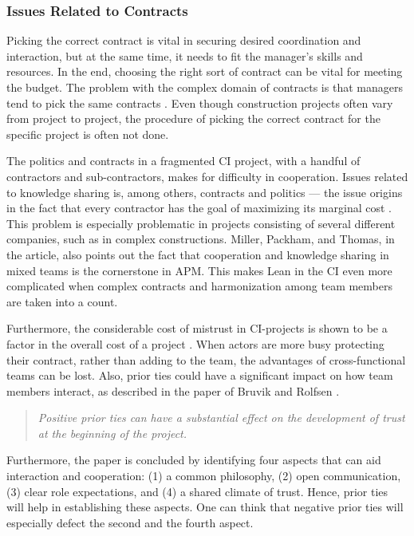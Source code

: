 \subsubsection*{Issues Related to Contracts}
Picking the correct contract is vital in securing desired coordination and interaction, but at the same time, it needs to fit the manager's skills and resources. In the end, choosing the right sort of contract can be vital for meeting the budget. The problem with the complex domain of contracts is that managers tend to pick the same contracts \cite{laedre2006procurement}. Even though construction projects often vary from project to project, the procedure of picking the correct contract for the specific project is often not done.

The politics and contracts in a fragmented CI project, with a handful of contractors and sub-contractors, makes for difficulty in cooperation. Issues related to knowledge sharing is, among others, contracts and politics \cite{alashwal2011knowledge} — the issue origins in the fact that every contractor has the goal of maximizing its marginal cost \cite{miller2002harmonization}. This problem is especially problematic in projects consisting of several different companies, such as in complex constructions. Miller, Packham, and Thomas, in the article, also points out the fact that cooperation and knowledge sharing in mixed teams is the cornerstone in APM. This makes Lean in the CI even more complicated when complex contracts and harmonization among team members are taken into a count. 

Furthermore, the considerable cost of mistrust in CI-projects is shown to be a factor in the overall cost of a project \cite{zaghloul2003construction}. When actors are more busy protecting their contract, rather than adding to the team, the advantages of cross-functional teams can be lost.  Also, prior ties could have a significant impact on how team members interact, as described in the paper of Bruvik and Rolfsen \cite{rolfsen}. 
\begin{quote}
    \textit{Positive prior ties can have a substantial effect on the development of trust at the beginning of the project.}
\end{quote}
Furthermore, the paper is concluded by identifying four aspects that can aid interaction and cooperation: (1) a common philosophy, (2) open communication, (3) clear role expectations, and (4) a shared climate of trust. Hence, prior ties will help in establishing these aspects. One can think that negative prior ties will especially defect the second and the fourth aspect. 

\cleardoublepage